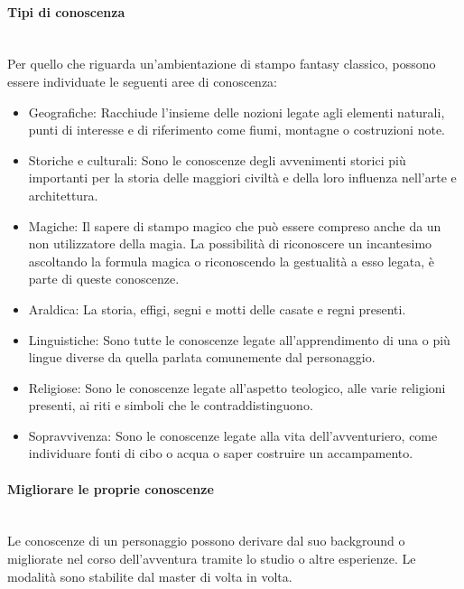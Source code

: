 \documentclass[../manuale_main.tex]{subfiles}
\begin{document}
\paragraph{Tipi di conoscenza}\mbox{}\\
Per quello che riguarda un'ambientazione di stampo fantasy classico, possono essere individuate le seguenti aree di conoscenza:
\begin{itemize}
\item Geografiche: Racchiude l'insieme delle nozioni legate agli elementi naturali, punti di interesse e di riferimento come fiumi, montagne o costruzioni note.
\item Storiche e culturali: Sono le conoscenze degli avvenimenti storici più importanti per la storia delle maggiori civiltà e della loro influenza nell'arte e architettura.
\item Magiche: Il sapere di stampo magico che può essere compreso anche da un non utilizzatore della magia. La possibilità di riconoscere un incantesimo ascoltando la formula magica o riconoscendo la gestualità a esso legata, è parte di queste conoscenze.
\item Araldica: La storia, effigi, segni e motti delle casate e regni presenti.
\item Linguistiche: Sono tutte le conoscenze legate all'apprendimento di una o più lingue diverse da quella parlata comunemente dal personaggio.
\item Religiose: Sono le conoscenze legate all'aspetto teologico, alle varie religioni presenti, ai riti e simboli che le contraddistinguono.
\item Sopravvivenza: Sono le conoscenze legate alla vita dell'avventuriero, come individuare fonti di cibo o acqua o saper costruire un accampamento.
\end{itemize}


\paragraph{Migliorare le proprie conoscenze}\mbox{}\\
Le conoscenze di un personaggio possono derivare dal suo background o migliorate nel corso dell'avventura tramite lo studio o altre esperienze. Le modalità sono stabilite dal master di volta in volta.
\end{document}
